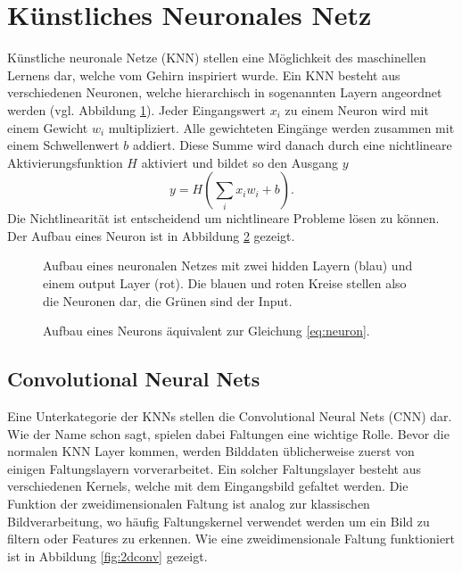 \section{Künstliches Neuronales Netz}

Künstliche neuronale Netze (KNN) stellen eine Möglichkeit des maschinellen Lernens dar, welche vom Gehirn inspiriert wurde.
Ein KNN besteht aus verschiedenen Neuronen, welche hierarchisch in sogenannten Layern angeordnet werden (vgl. Abbildung \ref{fig:neuralnet}).
Jeder Eingangswert $x_i$ zu einem Neuron wird mit einem Gewicht $w_i$ multipliziert.
Alle gewichteten Eingänge werden zusammen mit einem Schwellenwert $b$ addiert.
Diese Summe wird danach durch eine nichtlineare Aktivierungsfunktion $H$ aktiviert und bildet so den Ausgang $y$
\begin{equation} \label{eq:neuron}
y=H\left(\sum_{i} x_i w_i+b\right).
\end{equation}
Die Nichtlinearität ist entscheidend um nichtlineare Probleme lösen zu können.
Der Aufbau eines Neuron ist in Abbildung \ref{fig:neuron} gezeigt. 

\begin{figure}
	\centering
	
	\caption{Aufbau eines neuronalen Netzes mit zwei hidden Layern (blau) und einem output Layer (rot). Die blauen und roten Kreise stellen also die Neuronen dar, die Grünen sind der Input.}
	\label{fig:neuralnet}
\end{figure}

\begin{figure}
	\centering
	
	\caption{Aufbau eines Neurons äquivalent zur Gleichung \ref{eq:neuron}.}
	\label{fig:neuron}
\end{figure}

\subsection{Convolutional Neural Nets}

Eine Unterkategorie der KNNs stellen die Convolutional Neural Nets (CNN) dar.
Wie der Name schon sagt, spielen dabei Faltungen eine wichtige Rolle.
Bevor die normalen KNN Layer kommen, werden Bilddaten üblicherweise zuerst von einigen Faltungslayern vorverarbeitet.
Ein solcher Faltungslayer besteht aus verschiedenen Kernels, welche mit dem Eingangsbild gefaltet werden.
Die Funktion der zweidimensionalen Faltung ist analog zur klassischen Bildverarbeitung, wo häufig Faltungskernel verwendet werden um ein Bild zu filtern oder Features zu erkennen.
Wie eine zweidimensionale Faltung funktioniert ist in Abbildung \ref{fig:2dconv} gezeigt.

